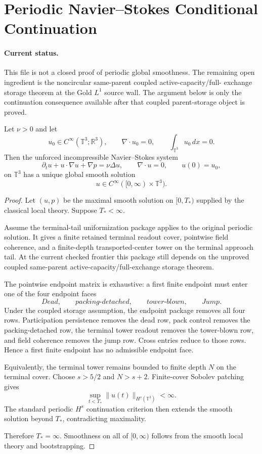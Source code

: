 \section{Periodic Navier--Stokes Conditional Continuation}

\paragraph{Current status.}
This file is not a closed proof of periodic global smoothness.  The remaining
open ingredient is the noncircular same-parent coupled active-capacity/full-
exchange storage theorem at the Gold \(L^1\) source wall.  The argument below is
only the continuation consequence available after that coupled parent-storage
object is proved.

\begin{proposition}
Let $\nu>0$ and let
\[
  u_0\in C^\infty(\mathbb T^3;\mathbb R^3),
  \qquad \nabla\cdot u_0=0,
  \qquad \int_{\mathbb T^3}u_0\,dx=0.
\]
Then the unforced incompressible Navier--Stokes system
\[
  \partial_tu+u\cdot\nabla u+\nabla p=\nu\Delta u,
  \qquad \nabla\cdot u=0,
  \qquad u(0)=u_0,
\]
on $\mathbb T^3$ has a unique global smooth solution
\[
  u\in C^\infty([0,\infty)\times\mathbb T^3).
\]
\end{proposition}

\begin{proof}
Let $(u,p)$ be the maximal smooth solution on $[0,T_*)$ supplied by the classical local theory. Suppose $T_*<\infty$.

Assume the terminal-tail uniformization package applies to the original periodic solution. It gives a finite retained terminal readout cover, pointwise field coherence, and a finite-depth transported-center tower on the terminal approach tail. At the current checked frontier this package still depends on the unproved coupled same-parent active-capacity/full-exchange storage theorem.

The pointwise endpoint matrix is exhaustive: a first finite endpoint must enter one of the four endpoint faces
\[
  Dead,\qquad packing\text{-}detached,\qquad tower\text{-}blown,\qquad Jump.
\]
Under the coupled storage assumption, the endpoint package removes all four rows. Participation persistence removes the dead row, pack control removes the packing-detached row, the terminal tower readout removes the tower-blown row, and field coherence removes the jump row. Cross entries reduce to those rows. Hence a first finite endpoint has no admissible endpoint face.

Equivalently, the terminal tower remains bounded to finite depth $N$ on the terminal cover. Choose $s>5/2$ and $N>s+2$. Finite-cover Sobolev patching gives
\[
  \sup_{t<T_*}\|u(t)\|_{H^s(\mathbb T^3)}<\infty.
\]
The standard periodic $H^s$ continuation criterion then extends the smooth solution beyond $T_*$, contradicting maximality.

Therefore $T_*=\infty$. Smoothness on all of $[0,\infty)$ follows from the smooth local theory and bootstrapping.
\end{proof}

